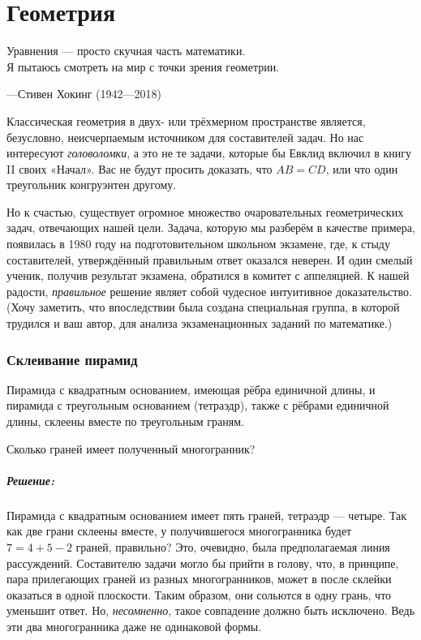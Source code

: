 \chapter*{Геометрия}

\setlength{\epigraphwidth}{.72\textwidth}
\epigraph{Уравнения --- просто скучная часть математики.\\
Я пытаюсь смотреть на мир с точки зрения геометрии.}{---Стивен Хокинг (1942---2018)}

Классическая геометрия в двух- или трёхмерном пространстве является, безусловно, неисчерпаемым источником для составителей задач. 
Но нас интересуют \emph{головоломки}, а это не те задачи, которые бы Евклид включил в книгу II своих «Начал».
Вас не будут просить доказать, что $AB=CD$, или что один треугольник конгруэнтен другому.

Но к счастью, существует огромное множество очаровательных геометрических задач, отвечающих нашей цели. 
Задача, которую мы разберём в качестве примера, появилась в 1980 году на подготовительном  школьном экзамене, %
где, к стыду составителей, %
утверждённый правильным ответ оказался неверен.
И один смелый ученик, получив результат экзамена, обратился в комитет с аппеляцией.
К нашей радости, \emph{правильное} решение являет собой  чудесное интуитивное доказательство.
(Хочу заметить, что впоследствии была создана специальная группа, в которой  трудился и ваш автор, для анализа экзаменационных заданий по математике.)

\subsection*{Склеивание пирамид}%

Пирамида с квадратным основанием, имеющая рёбра единичной длины, и пирамида с треугольным основанием (тетраэдр), также с рёбрами единичной длины, склеены вместе по треугольным граням.

Сколько граней имеет полученный многогранник?

\paragraph{Решение:}

Пирамида с квадратным основанием имеет пять граней, тетраэдр --- четыре.
Так как две грани склеены вместе, у получившегося многогранника будет $7=4+5-2$ граней, правильно?
Это, очевидно, была предполагаемая линия рассуждений.
Составителю задачи могло бы прийти в голову, что, в принципе, пара прилегающих граней из разных многогранников, может в после склейки оказаться в одной плоскости.
Таким образом, они сольются в одну грань, что уменьшит ответ.
Но, \emph{несомненно}, такое совпадение должно быть исключено.
Ведь эти два многогранника даже не одинаковой формы.

